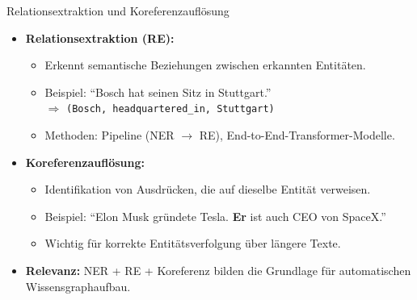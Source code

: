 \documentclass[aspectratio=1610, xcolor=dvipsnames, 9pt]{beamer}
\begin{document}
\begin{frame}{Relationsextraktion und Koreferenzauflösung}
  \begin{itemize}
    \item \textbf{Relationsextraktion (RE):}
      \begin{itemize}
        \item Erkennt semantische Beziehungen zwischen erkannten Entitäten.
        \item Beispiel: ``Bosch hat seinen Sitz in Stuttgart.''\\
          $\Rightarrow$ \texttt{(Bosch, headquartered\_in, Stuttgart)}
        \item Methoden: Pipeline (NER $\rightarrow$ RE), End-to-End-Transformer-Modelle.
      \end{itemize}
    \vspace{0.3cm}
    \item \textbf{Koreferenzauflösung:}
      \begin{itemize}
        \item Identifikation von Ausdrücken, die auf dieselbe Entität verweisen.
        \item Beispiel: ``Elon Musk gründete Tesla. \textbf{Er} ist auch CEO von SpaceX.''
        \item Wichtig für korrekte Entitätsverfolgung über längere Texte.
      \end{itemize}
    \vspace{0.2cm}
    \item \textbf{Relevanz:} NER + RE + Koreferenz bilden die Grundlage für automatischen Wissensgraphaufbau.
  \end{itemize}
\end{frame}
\end{document}
